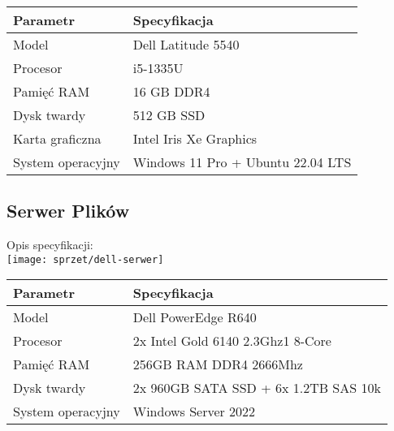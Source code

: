     \begin{flushleft}
        \begin{table}[h]
            \renewcommand{\arraystretch}{1.5}
            \begin{tabular}{|l|l|}
            \hline
                \textbf{Parametr} & \textbf{Specyfikacja} \\
            \hline
                Model & Dell Latitude 5540\\
                Procesor & i5-1335U \\
                Pamięć RAM & 16 GB DDR4 \\
                Dysk twardy & 512 GB SSD \\
                Karta graficzna & Intel Iris Xe Graphics \\
                System operacyjny & Windows 11 Pro + Ubuntu 22.04 LTS \\
            \hline
            \end{tabular}
        \end{table}  
    \end{flushleft}
\pagebreak

\subsection{Serwer Plików}

    Opis specyfikacji:\\
    \texttt{[image: sprzet/dell-serwer]}

    \begin{flushleft}
        \begin{table}[h]
            \renewcommand{\arraystretch}{1.5}
            \begin{tabular}{|l|l|}
            \hline
                \textbf{Parametr} & \textbf{Specyfikacja} \\
            \hline
                Model & Dell PowerEdge R640 \\
                Procesor & 2x Intel Gold 6140 2.3Ghz1 8-Core \\
                Pamięć RAM & 256GB RAM DDR4 2666Mhz \\
                Dysk twardy & 2x 960GB SATA SSD + 6x 1.2TB SAS 10k \\
                System operacyjny & Windows Server 2022 \\
            \hline
            \end{tabular}
        \end{table}  
    \end{flushleft}

